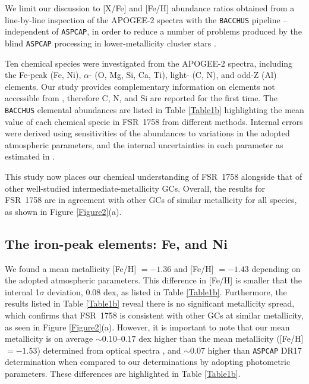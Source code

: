 \documentclass[longauth]{aa} %
\begin{document}
	We limit our discussion to [X/Fe] and [Fe/H] abundance ratios obtained from a line-by-line inspection of the APOGEE-2 spectra with the \texttt{BACCHUS} pipeline \citep{Masseron2016} -- independent of \texttt{ASPCAP}, in order to reduce a number of problems produced by the blind \texttt{ASPCAP} processing in lower-metallicity cluster stars \citep[see, e.g.,][]{Masseron2019, Meszaros2020}.
 
Ten chemical species were investigated from the APOGEE-2 spectra, including the Fe-peak (Fe, Ni), $\alpha$- (O, Mg, Si, Ca, Ti),  light- (C, N), and odd-Z (Al) elements. Our study provides complementary information on elements not accessible from \cite{Villanova2019}, therefore C, N, and Si are reported for the first time. The \texttt{BACCHUS} elemental abundances are listed in Table \ref{Table1b} highlighting the mean value of each chemical specie in FSR~1758 from different methods. Internal errors were derived using sensitivities of the abundances to variations in the adopted atmospheric parameters, and the internal uncertainties in each parameter as estimated in \citet{FT_Jurassic}.

This study now places our chemical understanding of FSR~1758 alongside that of other well-studied intermediate-metallicity GCs. Overall, the results for FSR~1758  are in agreement with other GCs of similar metallicity for all species, as shown in Figure \ref{Figure2}(a).

\subsection{The iron-peak elements: Fe, and Ni}

We found a mean metallicity [Fe/H] $=-1.36$ and [Fe/H] $=-1.43$ depending on the adopted atmospheric parameters. This difference in [Fe/H] is smaller that the internal 1$\sigma$ deviation, 0.08 dex, as listed in Table \ref{Table1b}. Furthermore, the results listed in Table \ref{Table1b} reveal there is no significant metallicity spread, which confirms that FSR~1758 is consistent with other GCs at similar metallicity, as seen in Figure \ref{Figure2}(a). However, it is important to note that our mean metallicity is on average $\sim0.10$--$0.17$ dex higher than the mean  metallicity ([Fe/H]$= -1.53$) determined from optical spectra \citep[][]{Villanova2019}, and $\sim$0.07 higher than \texttt{ASPCAP} DR17 determination when compared to our determinations by adopting photometric parameters. These differences are highlighted in Table \ref{Table1b}.
\end{document}
